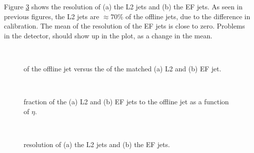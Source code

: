 Figure \ref{SW_jet_L2EF_Reco} shows the \et{} resolution of (a) the L2 jets and (b) the EF jets. 
As seen in previous figures, the L2 jets are $\approx 70 \%$ of the offline jets, due to the difference in calibration.
The mean of the \et{} resolution of the EF jets is close to zero. 
Problems in the detector, should show up in the plot, as a change in the mean.



\begin{figure}
\centering
\mbox{
              \quad
              \quad
                              }
\caption[Offline jet \et{} versus L2/EF jet \et{}]{
\et{} of the offline jet versus the \et{} of the matched (a) L2 and (b) EF jet.
\label{SW_jet_L2EF_EtEt}}
\end{figure}


\begin{figure}
\centering
\mbox{
              \quad
              \quad
                              }
\caption[\et{} fraction of L2 and EF jet to offline jet ]{
\et{} fraction of the (a) L2 and (b) EF jets to the offline jet \et{} as a function of $\eta$. 
\label{SW_jet_L2EF_EtFrac_Eta}}

\end{figure}

\begin{figure}
\centering
\mbox{
              \quad
              \quad
                              }
\caption[\et{} resolution between offline jet \et{} and L2/EF jet \et{}]{
\et{} resolution of (a) the L2 jets and (b) the EF jets. 
\label{SW_jet_L2EF_Reco}}
\end{figure}

